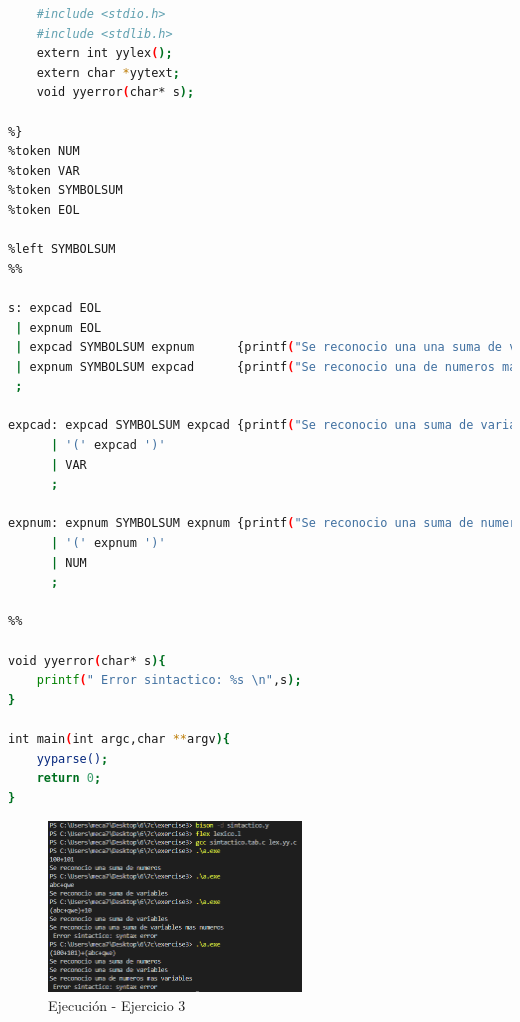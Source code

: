 \documentclass[12pt]{article}
\begin{document}
\begin{lstlisting}[language=bash,frame=single,style=CStyle,caption={sintactico.y}]
%{
    #include <stdio.h>
    #include <stdlib.h>
    extern int yylex();
    extern char *yytext;
    void yyerror(char* s);

%}
%token NUM
%token VAR
%token SYMBOLSUM
%token EOL

%left SYMBOLSUM
%%

s: expcad EOL                   
 | expnum EOL                       
 | expcad SYMBOLSUM expnum      {printf("Se reconocio una una suma de variables mas numeros \n");}
 | expnum SYMBOLSUM expcad      {printf("Se reconocio una de numeros mas variables \n");}
 ;

expcad: expcad SYMBOLSUM expcad {printf("Se reconocio una suma de variables \n");}
      | '(' expcad ')'
      | VAR
      ; 

expnum: expnum SYMBOLSUM expnum {printf("Se reconocio una suma de numeros \n");} 
      | '(' expnum ')'
      | NUM
      ; 

%%

void yyerror(char* s){
    printf(" Error sintactico: %s \n",s);
}

int main(int argc,char **argv){
    yyparse();
    return 0;
}
\end{lstlisting}

\begin{figure}[h]
    \centering
    \includegraphics[width=0.6\textwidth]{images/Capture003A.PNG}
    \caption{Ejecución - Ejercicio 3}
\end{figure}

\clearpage
\newpage
\end{document}
